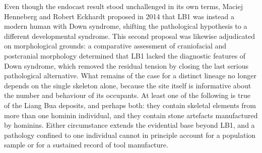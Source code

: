 \documentclass[11pt]{article}
\begin{document}
{Even though the endocast result stood unchallenged in its own terms, Maciej Henneberg and Robert Eckhardt proposed in 2014 that LB1 was instead a modern human with Down syndrome, shifting the pathological hypothesis to a different developmental syndrome. This second proposal was likewise adjudicated on morphological grounds: a comparative assessment of craniofacial and postcranial morphology determined that LB1 lacked the diagnostic features of Down syndrome, which removed the residual tension by closing the last serious pathological alternative. What remains of the case for a distinct lineage no longer depends on the single skeleton alone, because the site itself is informative about the number and behaviour of its occupants. At least one of the following is true of the Liang Bua deposits, and perhaps both: they contain skeletal elements from more than one hominin individual, and they contain stone artefacts manufactured by hominins. Either circumstance extends the evidential base beyond LB1, and a pathology confined to one individual cannot in principle account for a population sample or for a sustained record of tool manufacture.}
\end{document}

